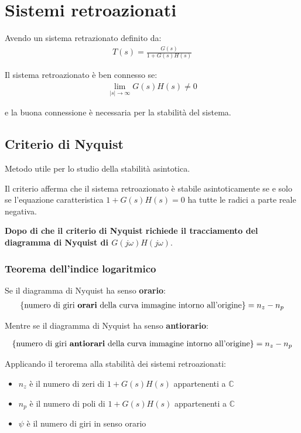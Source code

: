 \chapter{Sistemi retroazionati}
Avendo un sistema retrazionato definito da:
\begin{align}
  T(s) = \frac{G(s)}{1+G(s)H(s)}
\end{align}

Il sistema retroazionato \`e ben connesso se:
\begin{align}
  \lim_{|s| \to \infty} G(s)H(s) \neq 0
\end{align}

e la buona connessione \`e necessaria per la stabilit\`a del sistema.



\section{Criterio di Nyquist}
Metodo utile per lo studio della stabilit\`a asintotica.

Il criterio afferma che il sistema retroazionato \`e stabile asintoticamente
se e solo se l'equazione caratteristica $1 + G(s)H(s) = 0$ ha tutte le radici a parte reale 
negativa.

\textbf{Dopo di che il criterio di Nyquist richiede il tracciamento del diagramma di Nyquist di $G(j\omega)H(j\omega)$}.





\subsection{Teorema dell'indice logaritmico}

Se il diagramma di Nyquist ha senso \textbf{orario}:
\begin{align}
  \{\text{numero di giri \textbf{orari} della curva immagine intorno all'origine}\} = n_z - n_p
\end{align}


Mentre se il diagramma di Nyquist ha senso \textbf{antiorario}:

\begin{align}
  \{\text{numero di giri \textbf{antiorari} della curva immagine intorno all'origine}\} = n_z - n_p
\end{align}


Applicando il terorema alla stabilit\`a dei sistemi retroazionati:
\begin{itemize}
  \item $n_z$ \`e il numero di zeri di $1 + G(s)H(s)$ appartenenti a $\mathbb{C}$
  \item $n_p$ \`e il numero di poli di $1 + G(s)H(s)$ appartenenti a $\mathbb{C}$
  \item $\psi$ \`e il numero di giri in senso orario
\end{itemize}
